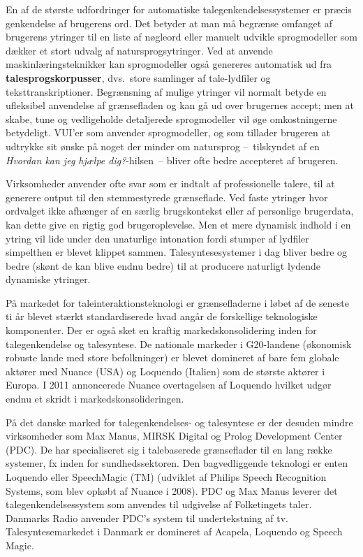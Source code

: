 \documentclass[]{../../metanetpaper}
\begin{document}
\begin{multicols}{2}
  En af de st\o rste udfordringer for automatiske talegenkendelsessystemer er pr\ae cis genkendelse af brugerens ord. Det betyder at man \mbox{m\aa} begr\ae nse omfanget af brugerens ytringer til en liste af n\o gleord eller manuelt udvikle sprogmodeller som d\ae kker et stort udvalg af natursprogsytringer. Ved at anvende maskinl\ae ringsteknikker kan sprogmodeller \mbox{ogs\aa} genereres automatisk ud fra {\bf talesprogskorpusser}, dvs.\ store samlinger af tale-lydfiler og teksttranskriptioner. Begr\ae nsning af mulige ytringer vil normalt betyde en ufleksibel anvendelse af gr\ae nsefladen og kan \mbox{g\aa} ud over brugernes accept; men at skabe, tune og vedligeholde detaljerede sprogmodeller vil \o ge omkostningerne betydeligt. VUI'er som anvender sprogmodeller, og som tillader brugeren at udtrykke sit \o nske \mbox{p\aa} noget der minder om natursprog --~tilskyndet af en {\it Hvordan kan jeg hj\ae lpe dig?}-hilsen~-- bliver ofte bedre accepteret af brugeren.


Virksomheder anvender ofte svar som er indtalt af professionelle talere, til at generere output til den stemmestyrede gr\ae nseflade. Ved faste ytringer hvor ordvalget ikke afh\ae nger af en s\ae rlig brugskontekst eller af personlige brugerdata, kan dette give en rigtig god brugeroplevelse. Men et mere dynamisk indhold i en ytring vil lide under den unaturlige intonation fordi stumper af lydfiler simpelthen er blevet klippet sammen. Talesyntesesystemer i dag bliver bedre og bedre (sk\o nt de kan blive endnu bedre) til at producere naturligt lydende dynamiske ytringer.

\mbox{P\aa} markedet for taleinteraktionsteknologi er gr\ae nsefladerne i l\o bet af de seneste ti \aa r blevet st\ae rkt standardiserede hvad ang\aa r de forskellige teknologiske komponenter. Der er \mbox{ogs\aa} sket en kraftig markedskonsolidering inden for talegenkendelse og talesyntese. De nationale markeder i G20-landene  (\o konomisk robuste lande med store befolkninger) er blevet domineret af bare fem globale akt\o rer med Nuance (USA) og Loquendo (Italien) som de st\o rste akt\o rer i Europa. I 2011 annoncerede Nuance overtagelsen af Loquendo hvilket udg\o r endnu et skridt i markedskonsolideringen. 

\mbox{P\aa} det danske marked for talegenkendelses- og talesyntese er der desuden mindre virksomheder som Max Manus, MIRSK Digital  og Prolog Development Center (PDC). De har specialiseret sig i talebaserede gr\ae nseflader til en lang r\ae kke systemer, fx inden for sundhedssektoren. Den bagvedliggende teknologi er enten Loquendo eller SpeechMagic (TM) (udviklet af Philips Speech Recognition Systems, som blev opk\o bt af Nuance i 2008). PDC og Max Manus leverer det talegenkendelsessystem som anvendes til udgivelse af Folketingets taler. Danmarks Radio anvender PDC's system til undertekstning af tv. Talesyntesemarkedet i Danmark er domineret af Acapela, Loquendo og Speech Magic.


\end{multicols}
\end{document}
